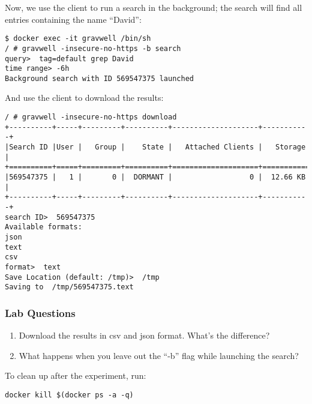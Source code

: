 Now, we use the client to run a search in the background; the search
will find all entries containing the name ``David'':

\begin{Verbatim}[breaklines=true]
$ docker exec -it gravwell /bin/sh
/ # gravwell -insecure-no-https -b search
query>  tag=default grep David
time range> -6h
Background search with ID 569547375 launched
\end{Verbatim}

And use the client to download the results:

\begin{Verbatim}[breaklines=true]
/ # gravwell -insecure-no-https download
+----------+-----+---------+----------+--------------------+-----------+
|Search ID |User |   Group |    State |   Attached Clients |   Storage |
+==========+=====+=========+==========+====================+===========+
|569547375 |   1 |       0 |  DORMANT |                  0 |  12.66 KB |
+----------+-----+---------+----------+--------------------+-----------+
search ID>  569547375
Available formats:
json
text
csv
format>  text
Save Location (default: /tmp)>  /tmp
Saving to  /tmp/569547375.text
\end{Verbatim}

\subsubsection{Lab Questions}

\begin{enumerate}
\item
  Download the results in csv and json format. What's the difference?
\item
  What happens when you leave out the ``-b'' flag while launching the
  search?
\end{enumerate}

To clean up after the experiment, run:

\begin{Verbatim}[breaklines=true]
docker kill $(docker ps -a -q)
\end{Verbatim}
